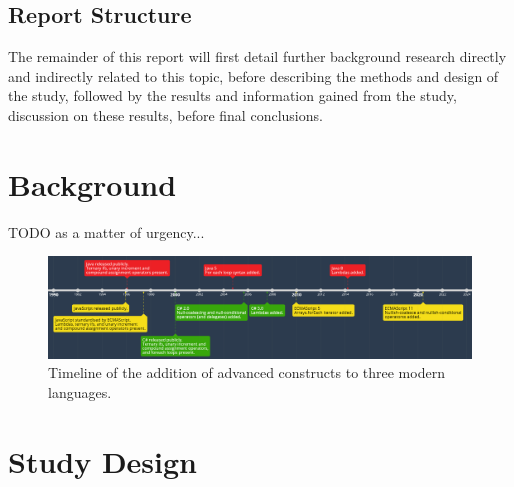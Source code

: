 \documentclass{article}
\begin{document}
    \subsection{Report Structure}
        The remainder of this report will first detail further background research directly and indirectly related to this topic, before describing the methods and design of the study, followed by the results and information gained from the study, discussion on these results, before final conclusions.
\newpage
\section{Background}
\label{sec:background}
TODO as a matter of urgency...
\begin{landscape}
    \begin{figure}[htbp]
        \centering
        \vspace{2in}
        \includegraphics[width=1.5\textheight]{timeline}
        \caption{Timeline of the addition of advanced constructs to three modern languages.}
        \label{fig:timeline}
    \end{figure}
\end{landscape}
\newpage
\section{Study Design}
\end{document}
